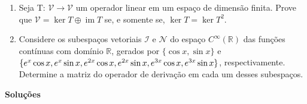 \documentclass{article}
\DeclareMathOperator{\im}{im}
\begin{document}
\begin{enumerate}
    \item Seja T: $\mathcal{V}\rightarrow\mathcal{V}$ um operador linear em um espaço de dimensão finita. Prove que $\mathcal{V}=\ker T \oplus \im T$ se, e somente se, $\ker T=\ker T^{2}$.
    
    \item Considere os subespaços vetoriais $\mathcal{I}$ e $\mathcal{N}$ do espaço $C^{\infty}(\mathbb{R})$ das funções contínuas com domínio $\mathbb{R}$, gerados por $\{\cos x, \sin x\}$ e $\{e^x \cos x, e^x \sin x, e^{2x} \cos x, e^{2x} \sin x, \newline e^{3x} \cos x, e^{3x} \sin x\}$, respectivamente. 
    Determine a matriz do operador de derivação em cada um desses subespaços.
\end{enumerate}

\begin{center}
    \textbf{Soluções}
\end{center}
\end{document}
